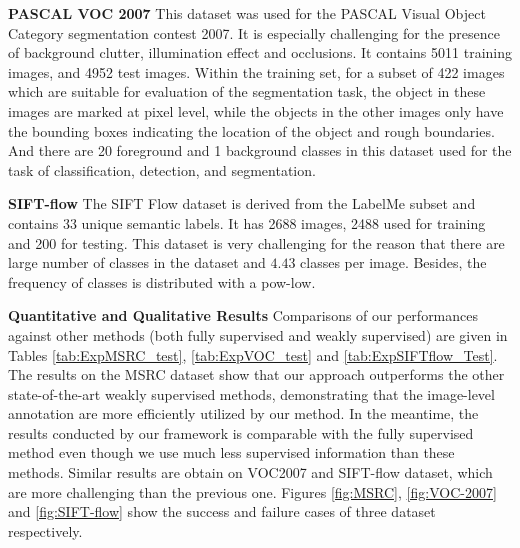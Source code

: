 \textbf{PASCAL VOC 2007}
This dataset was used for the PASCAL Visual Object Category segmentation contest 2007. It is especially challenging for the presence of background clutter, illumination effect and occlusions. It contains 5011 training images, and 4952 test images. Within the training set, for a subset of 422 images which are suitable for evaluation of the segmentation task, the object in these images are marked at pixel level, while the objects in the other images only have the bounding boxes indicating the location of the object and rough boundaries. And there are 20 foreground and 1 background classes in this dataset used for the task of classification, detection, and segmentation.


\textbf{SIFT-flow} The SIFT Flow dataset\cite{liu2011nonparametric} is derived from the LabelMe subset and contains 33 unique semantic labels. It has 2688 images, 2488 used for training and 200 for testing. This dataset is very challenging for the reason that there are large number of classes in the dataset and $4.43$ classes per image. Besides, the frequency of classes is distributed with a pow-low.

\textbf{Quantitative and Qualitative Results} Comparisons of our performances against other methods (both fully supervised and weakly supervised) are given in Tables \ref{tab:ExpMSRC_test}, \ref{tab:ExpVOC_test} and \ref{tab:ExpSIFTflow_Test}. The results on the MSRC dataset show that our approach outperforms the other state-of-the-art weakly supervised methods, demonstrating that the image-level annotation are more efficiently utilized by our method. In the meantime, the results conducted by our framework is comparable with the fully supervised method even though we use much less supervised information than these methods. Similar results are obtain on VOC2007 and SIFT-flow dataset, which are more challenging than the previous one. Figures \ref{fig:MSRC}, \ref{fig:VOC-2007} and \ref{fig:SIFT-flow} show the success and failure cases of three dataset respectively.

